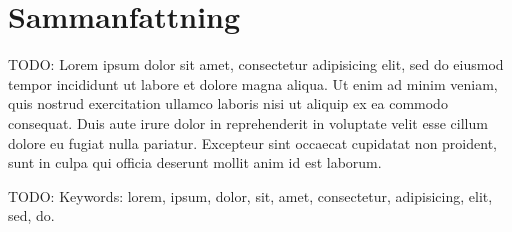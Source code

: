 \thispagestyle{plain}			%


\section*{Sammanfattning}
TODO: Lorem ipsum dolor sit amet, consectetur adipisicing elit, sed do eiusmod tempor incididunt ut labore et dolore magna aliqua. Ut enim ad minim veniam, quis nostrud exercitation ullamco laboris nisi ut aliquip ex ea commodo consequat. Duis aute irure dolor in reprehenderit in voluptate velit esse cillum dolore eu fugiat nulla pariatur. Excepteur sint occaecat cupidatat non proident, sunt in culpa qui officia deserunt mollit anim id est laborum.

\vfill
TODO: Keywords: lorem, ipsum, dolor, sit, amet, consectetur, adipisicing, elit, sed, do.

\newpage				%
\thispagestyle{empty}
\mbox{}